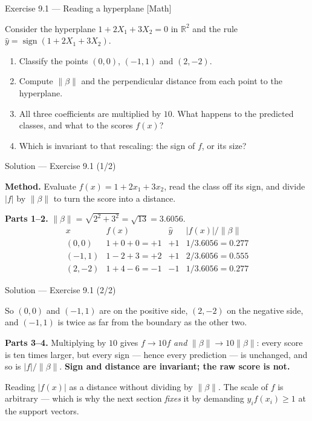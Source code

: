 \documentclass[aspectratio=169,11pt]{beamer}
\begin{document}
\begin{frame}{Exercise 9.1 --- Reading a hyperplane [Math]}
\begin{exercise}
  Consider the hyperplane $1 + 2X_1 + 3X_2 = 0$ in $\mathbb{R}^2$ and the rule
  $\hat y = \operatorname{sign}(1+2X_1+3X_2)$.
  \begin{enumerate}
    \item Classify the points $(0,0)$, $(-1,1)$ and $(2,-2)$.
    \item Compute $\|\beta\|$ and the perpendicular distance from each point to
          the hyperplane.
    \item All three coefficients are multiplied by $10$. What happens to the
          predicted classes, and what to the scores $f(x)$?
    \item Which is invariant to that rescaling: the sign of $f$, or its size?
  \end{enumerate}
\end{exercise}
\end{frame}

\begin{frame}{Solution --- Exercise 9.1 (1/2)}
\begin{solutionbox}
  \scriptsize
  \textbf{Method.} Evaluate $f(x)=1+2x_1+3x_2$, read the class off its sign,
  and divide $|f|$ by $\|\beta\|$ to turn the score into a distance.

  \textbf{Parts 1--2.} $\|\beta\|=\sqrt{2^2+3^2}=\sqrt{13}=3.6056$.
  \[
    \begin{array}{l|c|c|c}
      x & f(x) & \hat y & |f(x)|/\|\beta\| \\ \hline
      (0,0)  & 1+0+0 = +1 & +1 & 1/3.6056 = 0.277 \\
      (-1,1) & 1-2+3 = +2 & +1 & 2/3.6056 = 0.555 \\
      (2,-2) & 1+4-6 = -1 & -1 & 1/3.6056 = 0.277
    \end{array}
  \]
\end{solutionbox}
\end{frame}

\begin{frame}{Solution --- Exercise 9.1 (2/2)}
\begin{solutionbox}
  \scriptsize
  So $(0,0)$ and $(-1,1)$ are on the positive side, $(2,-2)$ on the negative
  side, and $(-1,1)$ is twice as far from the boundary as the other two.

  \textbf{Parts 3--4.} Multiplying by $10$ gives $f\to 10f$ \emph{and}
  $\|\beta\|\to 10\|\beta\|$: every score is ten times larger, but every sign
  --- hence every prediction --- is unchanged, and so is $|f|/\|\beta\|$.
  \textbf{Sign and distance are invariant; the raw score is not.}
\end{solutionbox}
\begin{mistake}
  Reading $|f(x)|$ as a distance without dividing by $\|\beta\|$. The scale of
  $f$ is arbitrary --- which is why the next section \emph{fixes} it by
  demanding $y_i f(x_i)\ge 1$ at the support vectors.
\end{mistake}
\end{frame}
\end{document}
